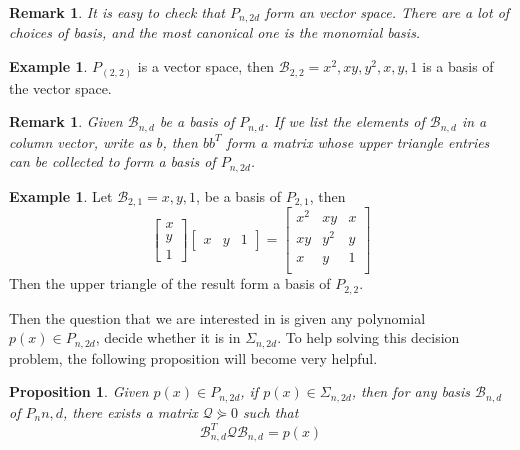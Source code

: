 \documentclass[12pt]{amsart}
\numberwithin{equation}{section}
\newtheorem{prop}[thm]{Proposition}
\newtheorem{remark}[thm]{Remark}
\theoremstyle{definition}
\newtheorem{example}[thm]{Example}
\numberwithin{thm}{section}
\begin{document}
\begin{remark}
     It is easy to check that $P_{n, 2d}$ form an vector space. There are a lot of choices of basis, and the most canonical one is the monomial basis.
\end{remark}

\begin{example}
     $P_(2, 2)$ is a vector space, then $\mathcal{B}_{2, 2} = {x^2, xy, y^2, x, y, 1}$ is a basis of the vector space.
\end{example}

\begin{remark}
     Given $\mathcal{B}_{n, d}$ be a basis of $P_{n, d}$. If we list the elements of $\mathcal{B}_{n, d}$ in a column vector, write as $b$, then $b b^T$ form a matrix whose upper triangle entries can be collected to form a basis of $P_{n, 2d}$.
\end{remark}

\begin{example}
     Let $\mathcal{B}_{2, 1} = {x, y, 1}$, be a basis of $P_{2, 1}$, then 
     \begin{equation}
          \begin{bmatrix}
               x \\
               y \\
               1
          \end{bmatrix}
          \begin{bmatrix}
               x & y & 1
          \end{bmatrix}
          = \begin{bmatrix}
               x^2 & xy & x \\
               xy & y^2 & y \\
               x & y & 1 \\
          \end{bmatrix}
     \end{equation}
     Then the upper triangle of the result form a basis of $P_{2, 2}$.
\end{example}

\smallskip
Then the question that we are interested in is given any polynomial $p(x) \in P_{n,2d}$, decide whether it is in $\Sigma_{n, 2d}$. 
To help solving this decision problem, the following proposition will become very helpful.

\begin{prop}
     Given $p(x) \in P_{n, 2d}$, if $p(x) \in \Sigma_{n, 2d}$, then for any basis $\mathcal{B}_{n, d}$ of $P_n{n, d}$, there exists a matrix $ \mathcal{Q} \curlyeqsucc 0$ such that
     \begin{equation}
          \mathcal{B}_{n, d} ^ T \mathcal{Q} \mathcal{B}_{n, d} = p(x)
     \end{equation}
\end{prop}
\end{document}
